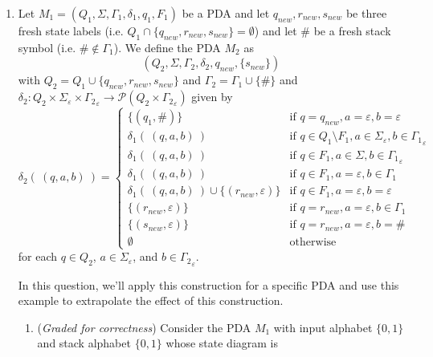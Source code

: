 \documentclass[12pt, oneside]{article}
\newcommand{\gradeCorrect}{({\it Graded for correctness}) }
\begin{document}
\begin{enumerate}[wide, labelwidth=!, labelindent=0pt]
\begin{enumerate}
\item Let $M_1 = (Q_1, \Sigma, \Gamma_1, \delta_1, q_1, F_1)$ 
be a PDA and let $q_{new}, r_{new}, s_{new}$ be three fresh state labels 
(i.e. $Q_1 \cap \{q_{new}, r_{new}, s_{new}\} = \emptyset$) 
and let $\#$ be a fresh stack symbol (i.e. $\# \notin \Gamma_1$).
We define the PDA $M_2$ as
\[
   (Q_2, \Sigma, \Gamma_2, \delta_2, q_{new}, \{s_{new}\})
\]
with $Q_2 = Q_1 \cup \{q_{new}, r_{new}, s_{new}\}$ 
and $\Gamma_2 = \Gamma_1 \cup \{\#\}$
and 
$\delta_2 : Q_2 \times \Sigma_\varepsilon \times {\Gamma_2}_\varepsilon \to 
\mathcal{P}(Q_2 \times {\Gamma_2}_\varepsilon)$ given by 
\[
\delta_2 ( ~(q,a,b)~) = 
\begin{cases}
\{(q_1, \#)\} &\text{if } q = q_{new}, a = \varepsilon, b = \varepsilon\\
\delta_1( ~(q,a,b)~) &\text{if } q\in Q_1 \setminus F_1, a \in \Sigma_{\varepsilon}, b \in {\Gamma_1}_\varepsilon \\
\delta_1( ~(q,a,b)~) &\text{if } q\in F_1, a \in \Sigma, b \in {\Gamma_1}_\varepsilon \\
\delta_1( ~(q,a,b)~) &\text{if } q\in F_1, a =\varepsilon, b \in {\Gamma_1} \\
\delta_1( ~(q,a,b)~) \cup \{(r_{new}, \varepsilon)\} &\text{if } q\in F_1, a =\varepsilon, b =\varepsilon \\
\{(r_{new}, \varepsilon)\} &\text{if } q = r_{new}, a =\varepsilon, b \in \Gamma_{1} \\
\{(s_{new}, \varepsilon)\} &\text{if } q= r_{new}, a = \varepsilon, b = \#\\
\emptyset & \text{otherwise}
\end{cases}
\]
for each $q \in Q_2$, $a \in \Sigma_{\varepsilon}$, 
and $b \in {\Gamma_2}_\varepsilon$.

In this question, we'll apply this construction for a specific PDA and 
use this example to extrapolate the effect of this construction.
\begin{enumerate}

\item\gradeCorrect Consider the PDA $M_1$ with input alphabet $\{0,1\}$ 
and stack alphabet $\{0,1\}$ whose state diagram is

\begin{center}

\end{center}
\end{enumerate}
\end{enumerate}
\end{enumerate}
\end{document}
